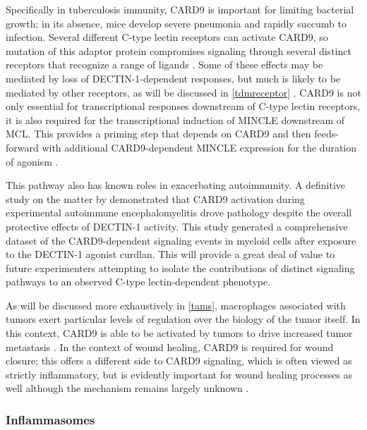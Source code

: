 Specifically in tuberculosis immunity, CARD9 is important for limiting bacterial growth; in its absence, mice develop severe pneumonia and rapidly succumb to infection. Several different C\hyp{}type lectin receptors can activate CARD9, so mutation of this adaptor protein compromises signaling through several distinct receptors that recognize a range of ligands \citep{Wagener2018}. Some of these effects may be mediated by loss of DECTIN\hyp{}1\hyp{}dependent responses, but much is likely to be mediated by other receptors, as will be discussed in \autoref{tdmreceptor} \citep{Marakalala2010, Marakalala2017}. CARD9 is not only essential for transcriptional responses downstream of C\hyp{}type lectin receptors, it is also required for the transcriptional induction of MINCLE downstream of MCL. This provides a priming step that depends on CARD9 and then feeds\hyp{}forward with additional CARD9\hyp{}dependent MINCLE expression for the duration of agonism \citep{Zhao2014}.

This pathway also has known roles in exacerbating autoimmunity. A definitive study on the matter by \citet{Deerhake2021} demonstrated that CARD9 activation during experimental autoimmune encephalomyelitis drove pathology despite the overall protective effects of DECTIN\hyp{}1 activity. This study generated a comprehensive dataset of the CARD9\hyp{}dependent signaling events in myeloid cells after exposure to the DECTIN\hyp{}1 agonist curdlan. This will provide a great deal of value to future experimenters attempting to isolate the contributions of distinct signaling pathways to an observed C\hyp{}type lectin\hyp{}dependent phenotype.

As will be discussed more exhaustively in \autoref{tams}, macrophages associated with tumors exert particular levels of regulation over the biology of the tumor itself. In this context, CARD9 is able to be activated by tumors to drive increased tumor metastasis \citep{Yang2014b}. In the context of wound healing, CARD9 is required for wound closure; this offers a different side to CARD9 signaling, which is often viewed as strictly inflammatory, but is evidently important for wound healing processes as well although the mechanism remains largely unknown \citep{Kanno2017}.

\subsubsection{Inflammasomes}\label{clr:asc}

